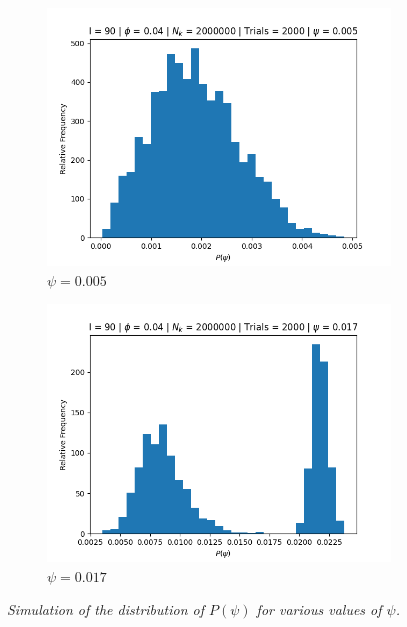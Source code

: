 \documentclass[letterpaper,12pt]{article}
\numberwithin{table}{section}
\numberwithin{figure}{section}
\numberwithin{equation}{section}
\newcommand{\ccaption}[1]{\caption{\textit{#1}}}
\begin{document}
\begin{flushleft}
\begin{figure}[!h]
        \begin{subfigure}{0.75\textwidth}
            \includegraphics[width=\linewidth]{img/pdist-psi0005.jpg}
            \caption{$\psi = 0.005$}
            \label{fig:pdist-psi0005}
        \end{subfigure}

        \begin{subfigure}{0.75\textwidth}
            \includegraphics[width=\linewidth]{img/pdist-psi0017.jpg}
            \caption{$\psi = 0.017$}
            \label{fig:pdist-psi0017}
        \end{subfigure}

        \captionsetup{width=\linewidth}
        \ccaption{Simulation of the distribution of $P(\psi)$ for various values of $\psi$.}


\end{figure}
\end{flushleft}
\end{document}
